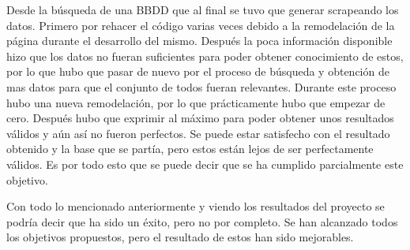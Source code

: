 \begin{itemize}
    Desde la búsqueda de una BBDD que al final se tuvo que generar scrapeando los datos. Primero
    por rehacer el código varias veces debido a la remodelación de la página durante el desarrollo
    del mismo. Después la poca información disponible hizo que los datos no fueran suficientes para
    poder obtener conocimiento de estos, por lo que hubo que pasar de nuevo por el proceso de
    búsqueda y obtención de mas datos para que el conjunto de todos fueran relevantes. Durante este
    proceso hubo una nueva remodelación, por lo que prácticamente hubo que empezar de cero. Después
    hubo que exprimir al máximo para poder obtener unos resultados válidos y aún así no fueron perfectos.
    Se puede estar satisfecho con el resultado obtenido y la base que se partía, pero estos están lejos
    de ser perfectamente válidos. Es por todo esto que se puede decir que se ha cumplido parcialmente
    este objetivo.
\end{itemize}

Con todo lo mencionado anteriormente y viendo los resultados del proyecto se podría decir que ha sido
un éxito, pero no por completo. Se han alcanzado todos los objetivos propuestos, pero el resultado
de estos han sido mejorables.


